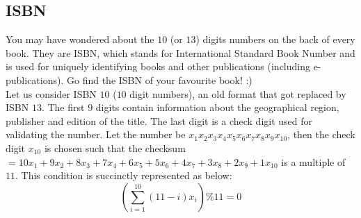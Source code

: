 \documentclass[../../Problems]{subfiles}
\begin{document}
\subsection{ISBN}
You may have wondered about the $10$ (or $13$) digits numbers on the back of every book. They are ISBN, which stands for International Standard Book Number and is used for uniquely identifying books and other publications (including e-publications). Go find the ISBN of your favourite book! :)\\
Let us consider ISBN $10$ ($10$ digit numbers), an old format that got replaced by ISBN $13$.
The first $9$ digits contain information about the geographical region, publisher and edition of the title. The last digit is a check digit used for validating the number.
Let the number be $x_1x_2x_3x_4x_5x_6x_7x_8x_9x_{10}$, then the check digit $x_{10}$ is chosen such that the checksum $= 10x_1 + 9x_2 + 8x_3 + 7x_4 + 6x_5 + 5x_6 + 4x_7 + 3x_8 + 2x_9 + 1x_{10}$ is a multiple of $11$.
This condition is succinctly represented as below:
\begin{equation}
{\displaystyle \left(\sum _{i=1}^{10}(11-i)x_{i} \right) \% 11 = 0}
\end{equation}
\end{document}
